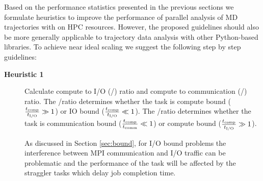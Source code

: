 \label{guideline}
Based on the performance statistics presented in the previous sections we formulate heuristics to improve the performance of parallel analysis of MD trajectories with  on HPC resources.
However, the proposed guidelines should also be more generally applicable to trajectory data analysis with other Python-based libraries.
To achieve near ideal scaling we suggest the following step by step guidelines:

\begin{description}
\item[\textbf{Heuristic 1}] Calculate compute to I/O (\tcomp/\tIO) ratio and compute to communication (\tcomp/\tcomm) ratio. The \tcomp/\tIO ratio determines whether the task is compute bound ($\frac{{t}_{\text{comp}}}{{t}_{\text{I/O}}} \gg 1$) or IO bound ($\frac{{t}_{\text{comp}}}{{t}_{\text{I/O}}} \ll 1$).
The \tcomp/\tcomm ratio determines whether the task is communication bound ($\frac{{t}_{\text{comp}}}{t_{\text{comm}}} \ll 1$) or compute bound ($\frac{{t}_{\text{comp}}}{{t}_{\text{I/O}}} \gg 1$).

As discussed in Section \ref{sec:bound}, for I/O bound problems the interference between MPI communication and I/O traffic can be problematic \cite{VMD2013, Kevin2018, Brown:2018ab} and the performance of the task will be affected by the straggler tasks which delay job completion time.
  

\end{description}
